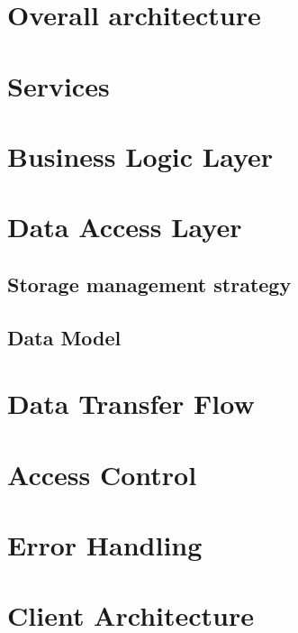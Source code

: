 \documentclass{report}
\begin{document}
\section{Overall architecture}


\section{Services}


\section{Business Logic Layer}


\section{Data Access Layer}
\subsection{Storage management strategy}

\subsection{Data Model}



\newpage
\section{Data Transfer Flow}


% 

\newpage
\section{Access Control}


\section{Error Handling}

\newpage


\section{Client Architecture}

\end{document}
